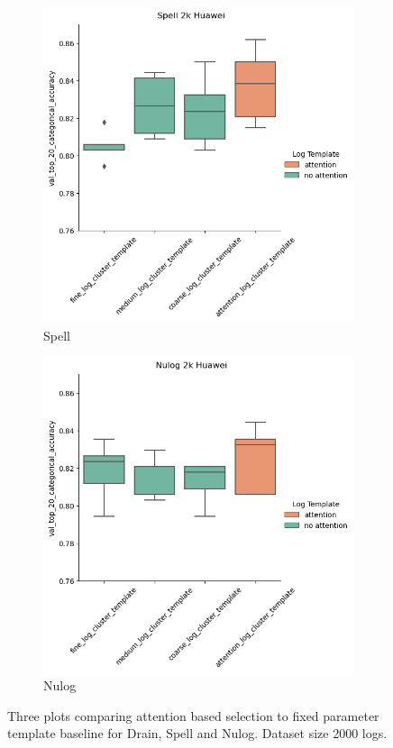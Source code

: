 \begin{figure}[H]
\begin{subfigure}[b]{0.45\textwidth}
        \includegraphics[keepaspectratio=true,scale=0.45]{figures/5_results/Spell_Huawei_2k.png}
         \caption{Spell}
         \label{fig:results:spell}
     \end{subfigure}
     \hfill
     \begin{subfigure}[b]{0.45\textwidth}
         \centering
        \includegraphics[keepaspectratio=true,scale=0.45]{figures/5_results/Nulog_Huawei_2k.png}
         \caption{Nulog}
         \label{results:nulog}
     \end{subfigure}
        \caption{Three plots comparing attention based selection to fixed parameter template baseline for Drain, Spell and Nulog. Dataset size 2000 logs. }
        \label{fig:results:Algos}
\end{figure}


